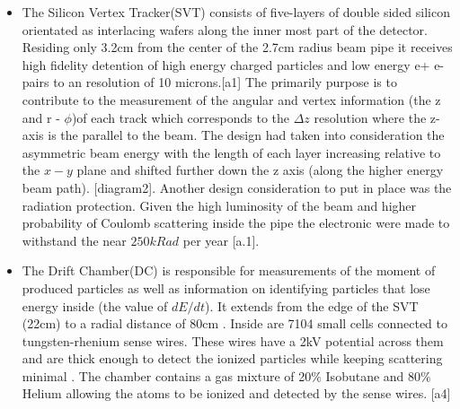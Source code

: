 \documentclass[floatfix,aps,prd,amsmath,amssymb]{revtex4}
\begin{document}
\begin{itemize}
\item The Silicon Vertex Tracker(SVT) consists of five-layers of double sided silicon orientated as interlacing wafers along the inner most part of the detector. Residing only 3.2cm from the center of the 2.7cm radius beam pipe it receives  high fidelity detention of high energy charged particles and low energy e+ e- pairs to an resolution of 10 microns.[a1] The primarily purpose is to contribute to the measurement of the angular and vertex information (the z  and r - $\phi$)of each track which corresponds to the $\Delta z$ resolution where the z-axis is the parallel to the beam. The design had taken into consideration the asymmetric beam energy with the length of each layer increasing relative to the $x-y$ plane and shifted further down the z axis (along the higher energy beam path). [diagram2]. Another design consideration to put in place was the radiation protection. Given the high luminosity of the beam and higher probability of Coulomb scattering inside the pipe the electronic were made to withstand the near $250kRad$ per year [a.1].




\item The Drift Chamber(DC) is responsible for measurements of the moment of produced particles as well as information on identifying particles that lose energy inside (the value of $dE/dt$). It extends from the edge of the SVT (22cm) to a radial distance of 80cm . Inside are 7104 small cells connected to tungsten-rhenium sense wires. These wires have a 2kV potential across them and are thick enough to detect the ionized particles while keeping scattering minimal . The chamber contains a gas mixture of 20$\%$ Isobutane and 80$\%$ Helium allowing the atoms to be ionized and detected by the sense wires. [a4]





\end{itemize}
\end{document}
